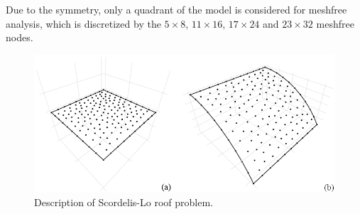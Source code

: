 Due to the symmetry, only a quadrant of the model is considered for meshfree analysis, which is discretized by the $5\times 8$, $11\times 16$, $17\times 24$ and $23\times32$ meshfree nodes.

\begin{figure}[h!]
\centering
\includegraphics[width=\textwidth]{figures/patchtest_msh}
\caption{Description of Scordelis-Lo roof problem.}\label{ptf2}
\end{figure}
